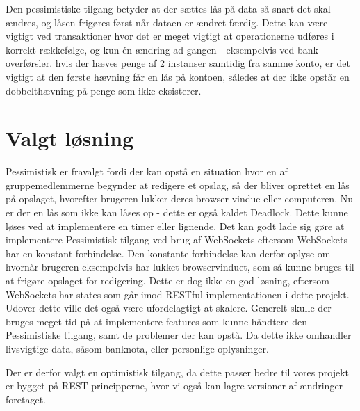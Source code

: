 Den pessimistiske tilgang betyder at der sættes lås på data så snart det skal ændres, og låsen frigøres først når dataen er ændret færdig. Dette kan være vigtigt ved transaktioner hvor det er meget vigtigt at operationerne udføres i korrekt rækkefølge, og kun én ændring ad gangen - eksempelvis ved bank-overførsler. hvis der hæves penge af 2 instanser samtidig fra samme konto, er det vigtigt at den første hævning får en lås på kontoen, således at der ikke opstår en dobbelthævning på penge som ikke eksisterer. 


\section{Valgt løsning}\label{sec:chosen_solution}
Pessimistisk er fravalgt fordi der kan opstå en situation hvor en af gruppemedlemmerne begynder at redigere et opslag, så der bliver oprettet en lås på opslaget, hvorefter brugeren lukker deres browser vindue eller computeren. Nu er der en lås som ikke kan låses op - dette er også kaldet Deadlock\cite{deadlock}. Dette kunne løses ved at implementere en timer eller lignende. Det kan godt lade sig gøre at implementere Pessimistisk tilgang ved brug af WebSockets\cite{websockets} eftersom WebSockets har en konstant forbindelse. Den konstante forbindelse kan derfor oplyse om hvornår brugeren eksempelvis har lukket browservinduet, som så kunne bruges til at frigøre opslaget for redigering. Dette er dog ikke en god løsning, eftersom WebSockets har states som går imod RESTful implementationen i dette projekt. Udover dette ville det også være ufordelagtigt at skalere. 
Generelt skulle der bruges meget tid på at implementere features som kunne håndtere den Pessimistiske tilgang, samt de problemer der kan opstå. Da dette ikke omhandler livsvigtige data, såsom banknota, eller personlige oplysninger. 

Der er derfor valgt en optimistisk tilgang, da dette passer bedre til vores projekt er bygget på REST principperne, hvor vi også kan lagre versioner af ændringer foretaget. 
